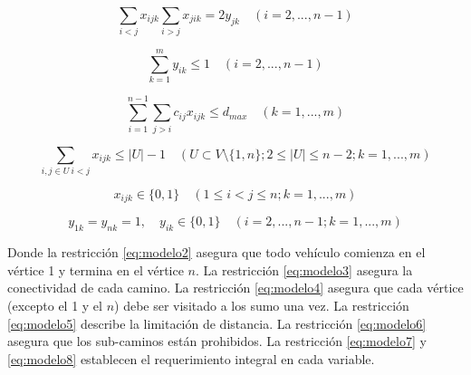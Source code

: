 \begin{equation} \label{eq:modelo3}
\sum_{i<j} x_{ijk} \sum_{i>j} x_{jik} = 2y_{jk} \quad (i =2,...,n-1)
\end{equation}

\begin{equation} \label{eq:modelo4}
\sum_{k=1}^{m} y_{ik} \leq 1 \quad (i =2,...,n-1)
\end{equation}

\begin{equation} \label{eq:modelo5}
\sum_{i=1}^{n-1} \sum_{j>i} c_{ij}x_{ijk} \leq d_{max} \quad (k=1,...,m)
\end{equation}

\begin{equation} \label{eq:modelo6}
\sum_{i,j\in U \ i<j} x_{ijk} \leq |U|-1 \quad (U \subset V \setminus \{1,n\} ; 2 \leq |U| \leq n-2; k=1,...,m)
\end{equation}

\begin{equation} \label{eq:modelo7}
x_{ijk} \in \{0,1\} \quad (1 \leq i < j \leq n; k=1,...,m)
\end{equation}

\begin{equation} \label{eq:modelo8}
y_{1k} = y_{nk} = 1, \quad y_{ik} \in \{0,1\} \quad (i = 2,...,n-1; k=1,...,m)
\end{equation}

Donde la restricción \ref{eq:modelo2} asegura que todo vehículo comienza en el vértice 1 y termina en el vértice $n$. La restricción \ref{eq:modelo3} asegura la conectividad de cada camino. La restricción \ref{eq:modelo4} asegura que cada vértice (excepto el 1 y el $n$) debe ser visitado a los sumo una vez. La restricción \ref{eq:modelo5} describe la limitación de distancia. La restricción \ref{eq:modelo6} asegura que los sub-caminos están prohibidos. La restricción \ref{eq:modelo7} y \ref{eq:modelo8} establecen el requerimiento integral en cada variable.


